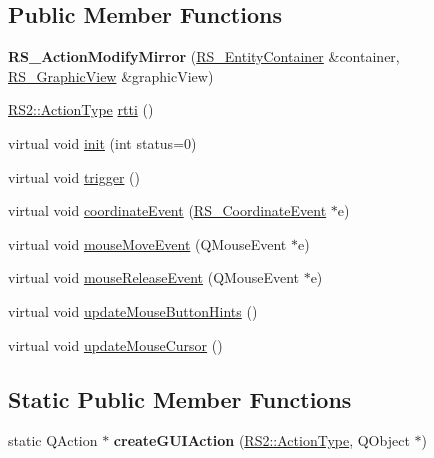 \subsection*{Public Member Functions}
\begin{DoxyCompactItemize}
\item 
\hypertarget{classRS__ActionModifyMirror_a4bd6eb7e4062ad7af6b1014970008c49}{{\bfseries R\-S\-\_\-\-Action\-Modify\-Mirror} (\hyperlink{classRS__EntityContainer}{R\-S\-\_\-\-Entity\-Container} \&container, \hyperlink{classRS__GraphicView}{R\-S\-\_\-\-Graphic\-View} \&graphic\-View)}\label{classRS__ActionModifyMirror_a4bd6eb7e4062ad7af6b1014970008c49}

\item 
\hyperlink{classRS2_afe3523e0bc41fd637b892321cfc4b9d7}{R\-S2\-::\-Action\-Type} \hyperlink{classRS__ActionModifyMirror_aa83a238fc8f59e24581658aa5b064a35}{rtti} ()
\item 
virtual void \hyperlink{classRS__ActionModifyMirror_a56b91ed9c2491a7ee5e610e7ca553023}{init} (int status=0)
\item 
virtual void \hyperlink{classRS__ActionModifyMirror_a7095c735f1a452181bf5cd8d77ba5be7}{trigger} ()
\item 
virtual void \hyperlink{classRS__ActionModifyMirror_a1edaa6c6d543e418bbb5993abd25ff40}{coordinate\-Event} (\hyperlink{classRS__CoordinateEvent}{R\-S\-\_\-\-Coordinate\-Event} $\ast$e)
\item 
virtual void \hyperlink{classRS__ActionModifyMirror_a996b3d5345558e736ee3a6826a143d3e}{mouse\-Move\-Event} (Q\-Mouse\-Event $\ast$e)
\item 
virtual void \hyperlink{classRS__ActionModifyMirror_a13dd9ef04a938d8b436e9c15ebd7ec30}{mouse\-Release\-Event} (Q\-Mouse\-Event $\ast$e)
\item 
virtual void \hyperlink{classRS__ActionModifyMirror_a05282e83115bfec3d3e70190e8692ea7}{update\-Mouse\-Button\-Hints} ()
\item 
virtual void \hyperlink{classRS__ActionModifyMirror_a9dda19d225387419effafc98c47ecb0d}{update\-Mouse\-Cursor} ()
\end{DoxyCompactItemize}
\subsection*{Static Public Member Functions}
\begin{DoxyCompactItemize}
\item 
\hypertarget{classRS__ActionModifyMirror_a8a2636fb0b40a08fce0b8952917cc5c1}{static Q\-Action $\ast$ {\bfseries create\-G\-U\-I\-Action} (\hyperlink{classRS2_afe3523e0bc41fd637b892321cfc4b9d7}{R\-S2\-::\-Action\-Type}, Q\-Object $\ast$)}\label{classRS__ActionModifyMirror_a8a2636fb0b40a08fce0b8952917cc5c1}

\end{DoxyCompactItemize}
